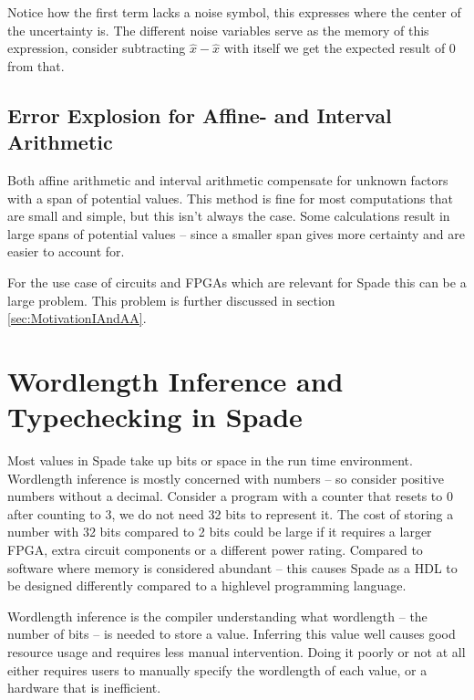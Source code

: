 Notice how the first term lacks a noise symbol, this expresses where the center of the uncertainty is. The different noise variables serve as the memory of this expression, consider subtracting $\hat{x} - \hat{x}$ with itself we get the expected result of 0 from that.


\subsection{Error Explosion for Affine- and Interval Arithmetic}
Both affine arithmetic and interval arithmetic compensate for unknown factors with a span of potential values. This method is fine for most computations that are small and simple, but this isn't always the case. Some calculations result in large spans of potential values -- since a smaller span gives more certainty and are easier to account for.

For the use case of circuits and FPGAs which are relevant for Spade this can be a large problem. This problem is further discussed in section \ref{sec:MotivationIAndAA}.


\cite{src:affAri}

\section{Wordlength Inference and Typechecking in Spade}
\label{sec:TheProblem}
Most values in Spade take up bits or space in the run time environment. Wordlength inference is mostly concerned with numbers -- so consider positive numbers without a decimal. Consider a program with a counter that resets to 0 after counting to 3, we do not need 32 bits to represent it. The cost of storing a number with 32 bits compared to 2 bits could be large if it requires a larger FPGA, extra circuit components or a different power rating. Compared to software where memory is considered abundant -- this causes Spade as a HDL to be designed differently compared to a highlevel programming language.

Wordlength inference is the compiler understanding what wordlength -- the number of bits -- is needed to store a value. Inferring this value well causes good resource usage and requires less manual intervention. Doing it poorly or not at all either requires users to manually specify the wordlength of each value, or a hardware that is inefficient.

